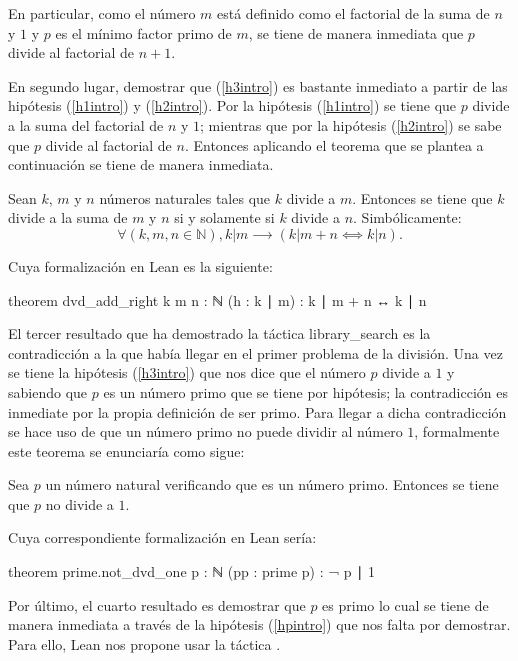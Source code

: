 En particular, como el número \(m\) está definido como el factorial de la suma
de \(n\) y \(1\) y \(p\) es el mínimo factor primo de \(m\), se tiene de manera
inmediata que \(p\) divide al factorial de \(n+1\).

En segundo lugar, demostrar que (\ref{h3intro}) es bastante inmediato a partir
de las hipótesis (\ref{h1intro}) y (\ref{h2intro}). Por la hipótesis
(\ref{h1intro}) se tiene que \(p\) divide a la suma del factorial de \(n\) y
\(1\); mientras que por la hipótesis (\ref{h2intro}) se sabe que \(p\) divide
al factorial de \(n\). Entonces aplicando el teorema que se plantea a
continuación se tiene de manera inmediata.
\begin{teorema}
  Sean \(k\), \(m\) y \(n\) números naturales tales que \(k\) divide a
  \(m\). Entonces se tiene que \(k\) divide a la suma de \(m\) y \(n\)
  si y solamente si \(k\) divide a \(n\).  Simbólicamente:
  \begin{equation*}
    ∀(k,m,n∈ℕ), k|m ⟶ (k|m+n⟺k|n).
  \end{equation*}
\end{teorema}

Cuya formalización en Lean es la siguiente:
\begin{leancode}
theorem dvd_add_right {k m n : ℕ} (h : k ∣ m) : k ∣ m + n ↔ k ∣ n
\end{leancode}

El tercer resultado que ha demostrado la táctica
 {library\_search} es la contradicción a la que
había llegar en el primer problema de la división. Una vez se tiene la
hipótesis (\ref{h3intro}) que nos dice que el número \(p\) divide a
\(1\) y sabiendo que \(p\) es un número primo que se tiene por
hipótesis; la contradicción es inmediate por la propia definición de ser
primo. Para llegar a dicha contradicción se hace uso de que un número
primo no puede dividir al número \(1\), formalmente este teorema se
enunciaría como sigue:
\begin{teorema}
  Sea \(p\) un número natural verificando que es un número primo. Entonces
  se tiene que \(p\) no divide a \(1\).
\end{teorema}
Cuya correspondiente formalización en Lean sería:
\begin{leancode}
theorem prime.not_dvd_one {p : ℕ} (pp : prime p) : ¬ p ∣ 1
\end{leancode}

Por último, el cuarto resultado es demostrar que \(p\) es primo lo cual
se tiene de manera inmediata a través de la hipótesis (\ref{hpintro}) que nos
falta por demostrar.  Para ello, Lean nos propone usar la táctica
.

